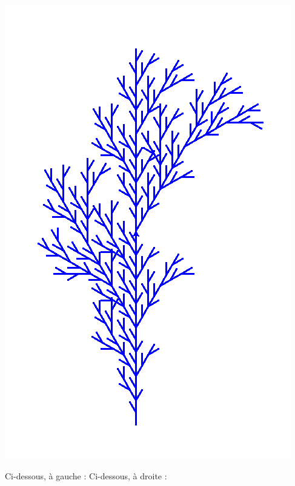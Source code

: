 \documentclass[11pt,class=report,crop=false]{standalone}
\begin{document}
\begin{center}
\includegraphics[scale=\myscale,scale=0.25]{figures/plante-01-4}
\end{center}


Ci-dessous, à gauche :
Ci-dessous, à droite  :
\end{document}
